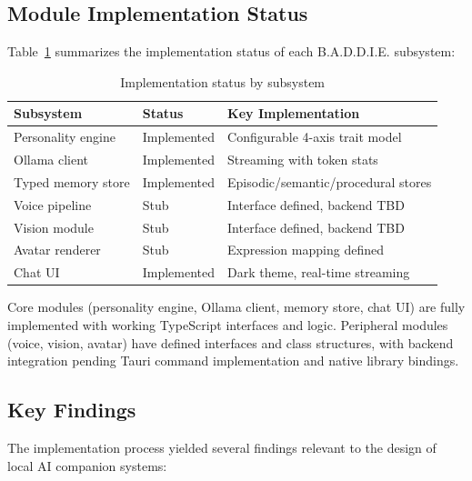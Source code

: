 \documentclass[sigconf]{acmart}
\begin{document}
\subsection{Module Implementation Status}

Table~\ref{tab:implementation} summarizes the implementation status of each B.A.D.D.I.E. subsystem:

\begin{table}[htbp]
    \centering
    \caption{Implementation status by subsystem}
    \label{tab:implementation}
    \begin{tabular}{@{}lll@{}}
        \toprule
        \textbf{Subsystem} & \textbf{Status} & \textbf{Key Implementation} \\
        \midrule
        Personality engine & Implemented & Configurable 4-axis trait model \\
        Ollama client & Implemented & Streaming with token stats \\
        Typed memory store & Implemented & Episodic/semantic/procedural stores \\
        Voice pipeline & Stub & Interface defined, backend TBD \\
        Vision module & Stub & Interface defined, backend TBD \\
        Avatar renderer & Stub & Expression mapping defined \\
        Chat UI & Implemented & Dark theme, real-time streaming \\
        \bottomrule
    \end{tabular}
\end{table}

Core modules (personality engine, Ollama client, memory store, chat UI) are fully implemented with working TypeScript interfaces and logic. Peripheral modules (voice, vision, avatar) have defined interfaces and class structures, with backend integration pending Tauri command implementation and native library bindings.

\subsection{Key Findings}

The implementation process yielded several findings relevant to the design of local AI companion systems:
\end{document}
